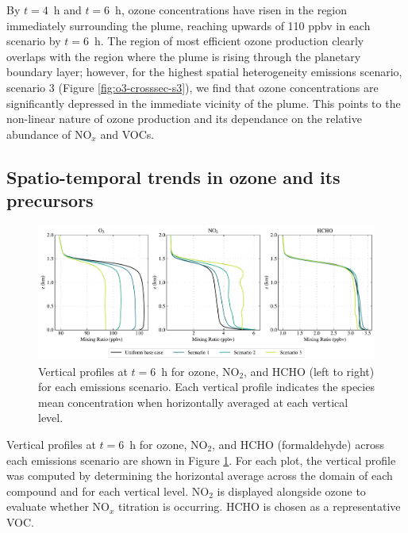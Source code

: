 By $t=4$~h and $t=6$~h, ozone concentrations have risen in the region immediately surrounding the plume, reaching upwards of 110 \si{ppbv} in each scenario by $t=6$~h. The region of most efficient ozone production clearly overlaps with the region where the plume is rising through the planetary boundary layer; however, for the highest spatial heterogeneity emissions scenario, scenario 3 (Figure \ref{fig:o3-crosssec-s3}), we find that ozone concentrations are significantly depressed in the immediate vicinity of the plume. This points to the non-linear nature of ozone production and its dependance on the relative abundance of NO$_x$ and VOCs.

\subsection{Spatio-temporal trends in ozone and its precursors}

\begin{figure}[h]
    \centering
    \includegraphics[width=\textwidth]{figures/chapter4/vertical-profiles-time36.pdf}
    \caption{Vertical profiles at $t=6$~h for ozone, NO$_2$, and HCHO (left to right) for each emissions scenario. Each vertical profile indicates the species mean concentration when horizontally averaged at each vertical level.}
    \label{fig:vertical-profiles-o3-nox-hcho}
  \end{figure}
  
Vertical profiles at $t=6$~h for ozone, NO$_2$, and HCHO (formaldehyde) across each emissions scenario are shown in Figure \ref{fig:vertical-profiles-o3-nox-hcho}. For each plot, the vertical profile was computed by determining the horizontal average across the domain of each compound and for each vertical level. NO$_2$ is displayed alongside ozone to evaluate whether NO$_x$ titration is occurring. HCHO is chosen as a representative VOC.

